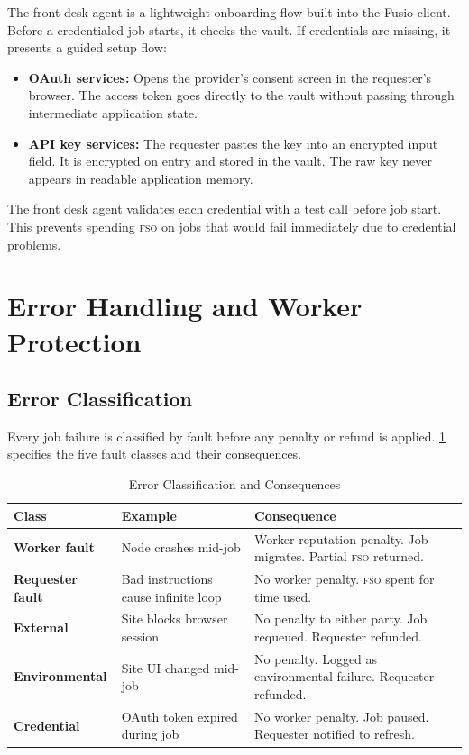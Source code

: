 \documentclass[10pt,twocolumn]{article}
\newcommand{\fso}{\textsc{fso}}
\begin{document}
The front desk agent is a lightweight onboarding flow built into the Fusio client. Before a credentialed job starts, it checks the vault. If credentials are missing, it presents a guided setup flow:

\begin{itemize}[noitemsep,leftmargin=*,topsep=2pt]
  \item \textbf{OAuth services:} Opens the provider's consent screen in the requester's browser. The access token goes directly to the vault without passing through intermediate application state.
  \item \textbf{API key services:} The requester pastes the key into an encrypted input field. It is encrypted on entry and stored in the vault. The raw key never appears in readable application memory.
\end{itemize}

The front desk agent validates each credential with a test call before job start. This prevents spending \fso{} on jobs that would fail immediately due to credential problems.

\section{Error Handling and Worker Protection}
\label{sec:errors}

\subsection{Error Classification}

Every job failure is classified by fault before any penalty or refund is applied. \cref{tab:errors} specifies the five fault classes and their consequences.

\begin{table}[H]
\centering
\caption{Error Classification and Consequences}
\label{tab:errors}
\renewcommand{\arraystretch}{1.35}
\begin{tabularx}{\columnwidth}{>{\bfseries\small}p{1.5cm} p{1.7cm} X}
\toprule
Class & Example & Consequence \\
\midrule
Worker fault & Node crashes mid-job & Worker reputation penalty. Job migrates. Partial \fso{} returned. \\
Requester fault & Bad instructions cause infinite loop & No worker penalty. \fso{} spent for time used. \\
External & Site blocks browser session & No penalty to either party. Job requeued. Requester refunded. \\
Environmental & Site UI changed mid-job & No penalty. Logged as environmental failure. Requester refunded. \\
Credential & OAuth token expired during job & No worker penalty. Job paused. Requester notified to refresh. \\
\bottomrule
\end{tabularx}
\end{table}
\end{document}
